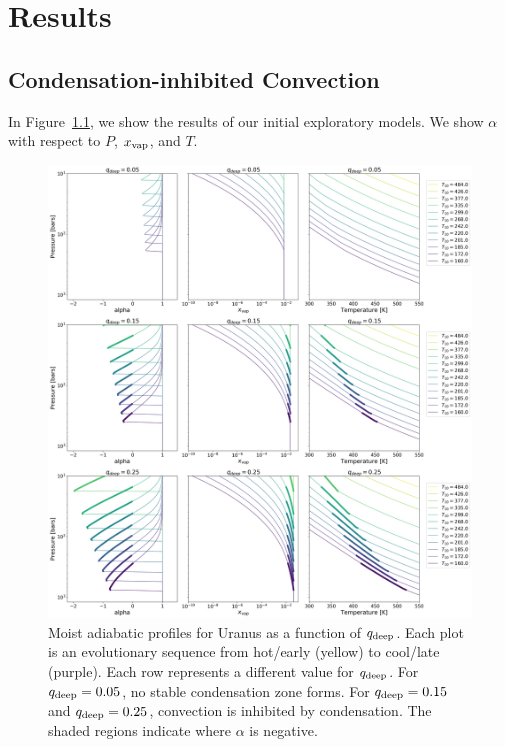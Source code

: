 \documentclass[11pt]{ucscthesisbs}
\begin{document}
\chapter{Results}

\section{Condensation-inhibited Convection}
In Figure~\ref{fig:convection_inhibited}, we show the results of our initial exploratory models. We show $\alpha$ with respect to $P$, $x_{\rm vap}$, and $T$. 
\begin{figure}[h]{}
 \centerline{
  \includegraphics[width=\columnwidth]{figures/convection_inhibited_2.png}
 }
\caption[Inhibition of convection on Uranus]
{Moist adiabatic profiles for Uranus as a function of  $q_{\rm deep}$. Each plot is an evolutionary sequence from hot/early (yellow) to cool/late (purple). Each row represents a different value for $q_{\rm deep}$. For $q_{\rm deep} = 0.05$, no stable condensation zone forms. For $q_{\rm deep} = 0.15$ and $q_{\rm deep} = 0.25$, convection is inhibited by condensation. The shaded regions indicate where $\alpha$ is negative.}
\label{fig:convection_inhibited}
\end{figure}
\end{document}
